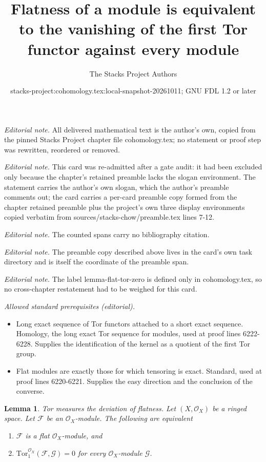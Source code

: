 \documentclass[10pt,a4paper]{amsart}
\title{Flatness of a module is equivalent to the vanishing of the first Tor functor against every module}
\author{The Stacks Project Authors}
\date{stacks-project:cohomology.tex:local-snapshot-20261011; GNU FDL 1.2 or later}
\theoremstyle{plain}
\newtheorem{lemma}[subsection]{Lemma}
\theoremstyle{definition}
\theoremstyle{remark}
\numberwithin{equation}{subsection}
\newenvironment{slogan}{\comment}{\endcomment}
\begin{document}
\maketitle
\noindent\textit{Editorial note.} All delivered mathematical text is the author's own, copied from the pinned Stacks Project chapter file cohomology.tex; no statement or proof step was rewritten, reordered or removed.\par\medskip
\noindent\textit{Editorial note.} This card was re-admitted after a gate audit: it had been excluded only because the chapter's retained preamble lacks the slogan environment. The statement carries the author's own slogan, which the author's preamble comments out; the card carries a per-card preamble copy formed from the chapter retained preamble plus the project's own three display environments copied verbatim from sources/stacks-chow/preamble.tex lines 7-12.\par\medskip
\noindent\textit{Editorial note.} The counted spans carry no bibliography citation.\par\medskip
\noindent\textit{Editorial note.} The preamble copy described above lives in the card's own task directory and is itself the coordinate of the preamble span.\par\medskip
\noindent\textit{Editorial note.} The label lemma-flat-tor-zero is defined only in cohomology.tex, so no cross-chapter restatement had to be weighed for this card.\par\medskip
\noindent\textit{Allowed standard prerequisites (editorial).}\begin{itemize}
\item Long exact sequence of Tor functors attached to a short exact sequence. Homology, the long exact Tor sequence for modules, used at proof lines 6222-6228. Supplies the identification of the kernel as a quotient of the first Tor group.
\item Flat modules are exactly those for which tensoring is exact. Standard, used at proof lines 6220-6221. Supplies the easy direction and the conclusion of the converse.
\end{itemize}\medskip
\begin{lemma}
\label{lemma-flat-tor-zero}
\begin{slogan}
Tor measures the deviation of flatness.
\end{slogan}
Let $(X, \mathcal{O}_X)$ be a ringed space.
Let $\mathcal{F}$ be an $\mathcal{O}_X$-module.
The following are equivalent
\begin{enumerate}
\item $\mathcal{F}$ is a flat $\mathcal{O}_X$-module, and
\item $\text{Tor}_1^{\mathcal{O}_X}(\mathcal{F}, \mathcal{G}) = 0$
for every $\mathcal{O}_X$-module $\mathcal{G}$.
\end{enumerate}
\end{lemma}
\end{document}
